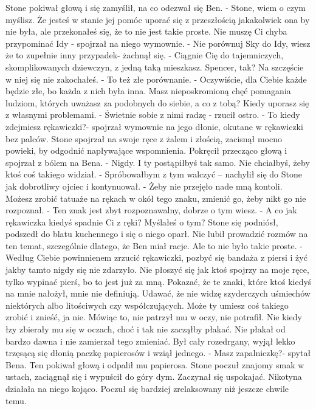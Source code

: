 \documentclass[12pt,a4paper]{book}
\begin{document}
Stone pokiwał głową i się zamyślił, na co odezwał się Ben.  
- Stone, wiem o czym myślisz. Że jesteś w stanie jej pomóc uporać się z przeszłością jakakolwiek ona by nie była, ale przekonałeś się, że to nie jest takie proste. Nie muszę Ci chyba przypominać Idy - spojrzał na niego wymownie. 
- Nie porównuj Sky do Idy, wiesz że to zupełnie inny przypadek- żachnął się.
- Ciągnie Cię do tajemniczych, skomplikowanych dziewczyn, z jedną taką mieszkasz. Spencer, tak? Na szczęście w niej się nie zakochałeś. 
- To też złe porównanie. 
- Oczywiście, dla Ciebie każde będzie złe, bo każda z nich była inna. Masz nieposkromioną chęć pomagania ludziom, których uważasz za podobnych do siebie, a co z tobą? Kiedy uporasz się z własnymi problemami. 
- Świetnie sobie z nimi radzę - rzucił ostro.
- To kiedy zdejmiesz rękawiczki?- spojrzał wymownie na jego dłonie, okutane w rękawiczki bez palców.
Stone spojrzał na swoje ręce z żalem i złością, zacisnął mocno powieki, by odgodnić napływające wspomnienia. Pokręcił przecząco głową i spojrzał z bólem na Bena.
- Nigdy. I ty postąpiłbyś tak samo. Nie chciałbyś, żeby ktoś coś takiego widział. 
- Spróbowałbym z tym walczyć – nachylił się do Stone jak dobrotliwy ojciec i kontynuował. - Żeby nie przejęło nade mną kontoli. Możesz zrobić tatuaże na rękach w okół tego znaku, zmienić go, żeby nikt go nie rozpoznał. 
- Ten znak jest zbyt rozpoznawalny, dobrze o tym wiesz. 
- A co jak rękawiczka kiedyś spadnie Ci z ręki? Myślałeś o tym?
Stone się podniósł, podszedł do blatu kuchennego i się o niego oparł. Nie lubił prowadzić rozmów na ten temat, szczególnie dlatego, że Ben miał racje. Ale to nie było takie proste. 
- Według Ciebie powinnienem zrzucić rękawiczki, pozbyć się bandaża z piersi i żyć jakby tamto nigdy się nie zdarzyło. Nie płoszyć się jak ktoś spojrzy na moje ręce, tylko wypinać pierś, bo to jest już za mną. Pokazać, że te znaki, które ktoś kiedyś na mnie nałożył, mnie nie definiują. Udawać, że nie widzę szyderczych uśmiechów niektórych albo litościwych czy współczujących. Może ty umiesz coś takiego zrobić i znieść, ja nie. 
Mówiąc to, nie patrzył mu w oczy, nie potrafił. Nie kiedy łzy zbierały mu się w oczach, choć i tak nie zacząłby płakać. Nie płakał od bardzo dawna i nie zamierzał tego zmieniać. Był cały rozedrgany, wyjął lekko trzęsącą się dłonią paczkę papierosów i wziął jednego.
- Masz zapalniczkę?- spytał Bena.
Ten pokiwał głową i odpalił mu papierosa. Stone poczuł znajomy smak w ustach, zaciągnął się i wypuścił do góry dym. Zaczynał się uspokajać. Nikotyna działała na niego kojąco. Poczuł się bardziej zrelaksowany niż jeszcze chwile temu. 
\end{document}
